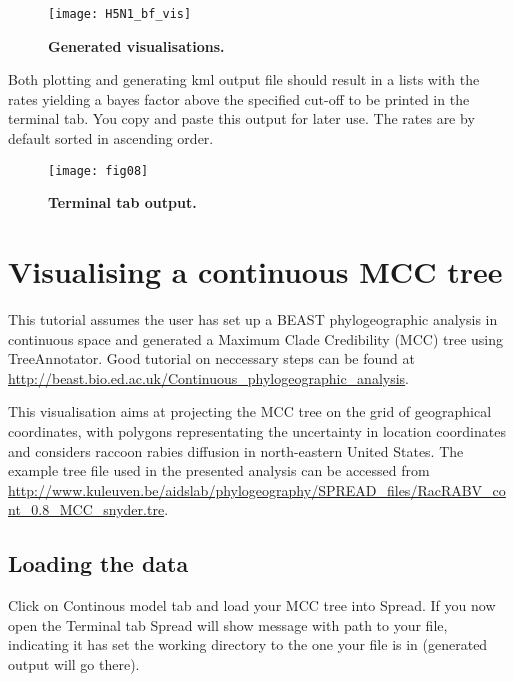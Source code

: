 \begin{figure}[H]
\begin{centering}
\texttt{[image: H5N1\_bf\_vis]}
\caption{
{ \footnotesize 
{\bf Generated visualisations.}
} %
}
\label{fig:07}
\par\end{centering}
\end{figure}

Both plotting and generating kml output file should result in a lists
with the rates yielding a bayes factor above the specified cut-off
to be printed in the terminal tab. You copy and paste this output
for later use. The rates are by default sorted in ascending order.


\begin{figure}[H]
\begin{centering}
\texttt{[image: fig08]}
\caption{
{ \footnotesize 
{\bf Terminal tab output.}
} %
}
\label{fig:08}
\par\end{centering}
\end{figure}

\section{Visualising a continuous MCC tree}

This tutorial assumes the user has set up a BEAST phylogeographic
analysis in continuous space and generated a Maximum Clade Credibility
(MCC) tree using TreeAnnotator. Good tutorial on neccessary steps
can be found at \url{http://beast.bio.ed.ac.uk/Continuous_phylogeographic_analysis}.

This visualisation aims at projecting the MCC tree on the grid of
geographical coordinates, with polygons representating the uncertainty
in location coordinates and considers raccoon rabies diffusion in
north-eastern United States. 
The example tree file used in the presented analysis can be accessed
from \url{http://www.kuleuven.be/aidslab/phylogeography/SPREAD_files/RacRABV_cont_0.8_MCC_snyder.tre}.


\subsection{Loading the data}

Click on Continous model tab and load your MCC tree into Spread. If
you now open the Terminal tab Spread will show message with path to
your file, indicating it has set the working directory to the one
your file is in (generated output will go there).

